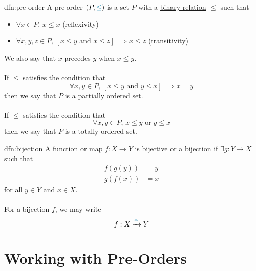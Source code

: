 \begin{dfn}{dfn:pre-order}
    A \textcolor{dfn-color}{pre-order} \( (P, \textcolor{dfn-color}{\leq}) \) is a set \( P \) with a \hyperref[dfn:relation]{binary relation} \( \leq \) such that
    \begin{itemize}
        \item \( \forall x \in P, \, x \leq x \) (reflexivity)
        \item \( \forall x, y, z \in P, \, [x \leq y \text{ and } x \leq z] \implies x \leq z \) (transitivity)
    \end{itemize}
    We also say that \( x \) \textcolor{dfn-color}{precedes} \( y \) when \( x \leq y \).
    \\ \\
    If \( \leq \) satisfies the condition that
    \[
        \forall x, y \in P, \, [x \leq y \text{ and } y \leq x] \implies x = y
    \]
    then we say that \( P \) is a \textcolor{dfn-color}{partially ordered set}.
    \\ \\
    If \( \leq \) satisfies the condition that
    \[
        \forall x, y \in P, \, x \leq y \text{ or } y \leq x
    \]
    then we say that \( P \) is a \textcolor{dfn-color}{totally ordered set}.
\end{dfn}

\begin{dfn}{dfn:bijection}
    A function or map \( f : X \to Y \) is \textcolor{dfn-color}{bijective} or \textcolor{dfn-color}{a bijection} if \( \exists g : Y \to X \) such that
    \begin{align*}
        f(g(y)) &= y \\
        g(f(x)) &= x
    \end{align*}
    for all \( y \in Y \) and \( x \in X \).
    \\ \\
    For a bijection \( f \), we may write
    \[
        f : X \xrightarrow{\textcolor{dfn-color}{\cong}} Y
    \]
\end{dfn}

\section{Working with Pre-Orders}\label{sec:working-with-pre-orders}

